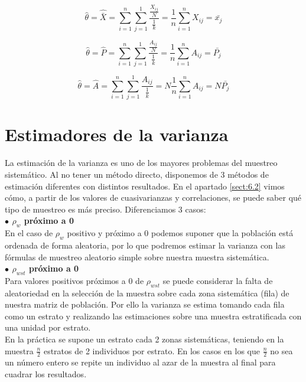 \begin{equation}
    \hat{\theta} = \hat{\bar{X}} = \sum_{i=1}^{n}\sum_{j=1}^1\frac{\frac{X_{ij}}{N}}{\frac{1}{k}} = \frac{1}{n}\sum_{i=1}^{n}X_{ij} = \bar{x_j}
\end{equation}

\begin{equation}
    \hat{\theta} = \hat{P} =  \sum_{i=1}^{n}\sum_{j=1}^1\frac{\frac{A_{ij}}{N}}{\frac{1}{k}} = \frac{1}{n}\sum_{i=1}^{n}A_{ij} = \bar{P_j}
\end{equation}

\begin{equation}
    \hat{\theta} = \hat{A}  = \sum_{i=1}^{n}\sum_{j=1}^1\frac{A_{ij}}{\frac{1}{k}} = N\frac{1}{n}\sum_{i=1}^{n}A_{ij} = N\bar{P_j}
\end{equation}

\section{Estimadores de la varianza} \label{sect:5.4}
La estimación de la varianza es uno de los mayores problemas del muestreo sistemático. Al no tener un método directo, disponemos de 3 métodos de estimación diferentes con distintos resultados. En el apartado \ref{sect:6.2} vimos cómo, a partir de los valores de cuasivarianzas y correlaciones, se puede saber qué tipo de muestreo es más preciso.
Diferenciamos 3 casos:\\

\textbf{$\bullet$ \boldmath$\rho_w$ próximo a 0}\\

En el caso de $\rho_w$ positivo y próximo a 0 podemos suponer que la población está ordenada de forma aleatoria, por lo que podremos estimar la varianza con las fórmulas de muestreo aleatorio simple sobre nuestra muestra sistemática.\\

\textbf{$\bullet$ \boldmath$\rho_{wst}$ próximo a 0}\\

Para valores positivos próximos a 0 de $\rho_{wst}$ se puede considerar la falta de aleatoriedad en la selección de la muestra sobre cada zona sistemática (fila) de nuestra matriz de población. Por ello la varianza se estima tomando cada fila como un estrato y realizando las estimaciones sobre una muestra estratificada con una unidad por estrato.\\

En la práctica se supone un estrato cada 2 zonas sistemáticas, teniendo en la muestra $\frac{n}{2}$ estratos de 2 individuos por estrato. En los casos en los que $\frac{n}{2}$ no sea un número entero se repite un individuo al azar de la muestra al final para cuadrar los resultados.\\

